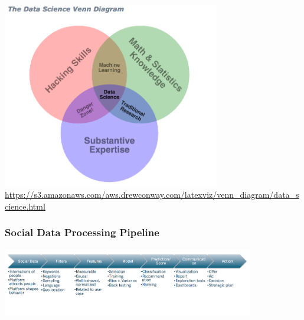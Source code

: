\documentclass{beamer}
\begin{document}
\begin{frame}
  \begin{center}
    \includegraphics[width=9.5cm]{./imgs/conway_datascientist.png} \\
    \textcolor{white}{\tiny \url{https://s3.amazonaws.com/aws.drewconway.com/latexviz/venn_diagram/data_science.html}}
  \end{center}
\end{frame}

\begin{frame}\frametitle{Social Data Processing Pipeline}
  \begin{center}
    \includegraphics[width=11cm]{./imgs/pipeline.png} \\
  \end{center}
\end{frame}
\end{document}
